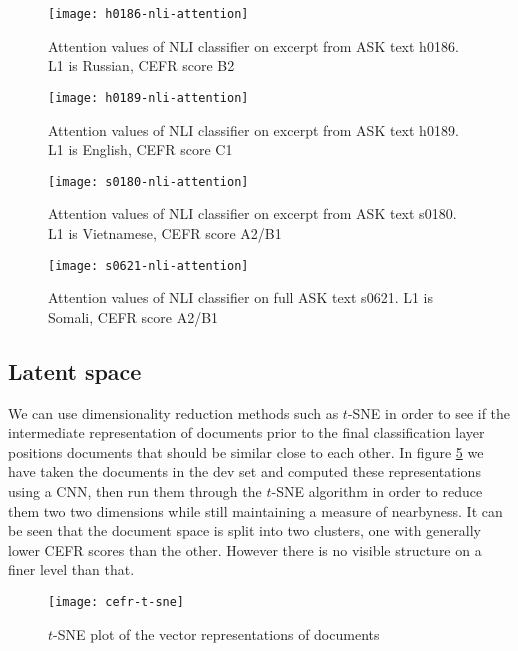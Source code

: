 \begin{figure}
  \centering
  \texttt{[image: h0186-nli-attention]}
  \caption{Attention values of NLI classifier on excerpt from ASK text h0186.
           L1 is Russian, CEFR score B2}
  \label{fig:h0186-nli-attention}
\end{figure}

\begin{figure}
  \centering
  \texttt{[image: h0189-nli-attention]}
  \caption{Attention values of NLI classifier on excerpt from ASK text h0189.
           L1 is English, CEFR score C1}
  \label{fig:h0189-nli-attention}
\end{figure}

\begin{figure}
  \centering
  \texttt{[image: s0180-nli-attention]}
  \caption{Attention values of NLI classifier on excerpt from ASK text s0180.
           L1 is Vietnamese, CEFR score A2/B1}
  \label{fig:s0180-nli-attention}
\end{figure}

\begin{figure}
  \centering
  \texttt{[image: s0621-nli-attention]}
  \caption{Attention values of NLI classifier on full ASK text s0621.
           L1 is Somali, CEFR score A2/B1}
  \label{fig:s0621-nli-attention}
\end{figure}


\subsection{Latent space}

We can use dimensionality reduction methods such as $t$-SNE in order to see
if the intermediate representation of documents prior to the final
classification layer positions documents that should be similar close to each
other. In figure \ref{fig:cefr-t-sne} we have taken the documents in the dev
set and computed these representations using a \ac{CNN}, then run them through
the $t$-SNE algorithm in order to reduce them two two dimensions while still
maintaining a measure of nearbyness. It can be seen that the document space
is split into two clusters, one with generally lower CEFR scores than the
other. However there is no visible structure on a finer level than that.

\begin{figure}
  \centering
  \texttt{[image: cefr-t-sne]}
  \caption{$t$-SNE plot of the vector representations of documents}
  \label{fig:cefr-t-sne}
\end{figure}

